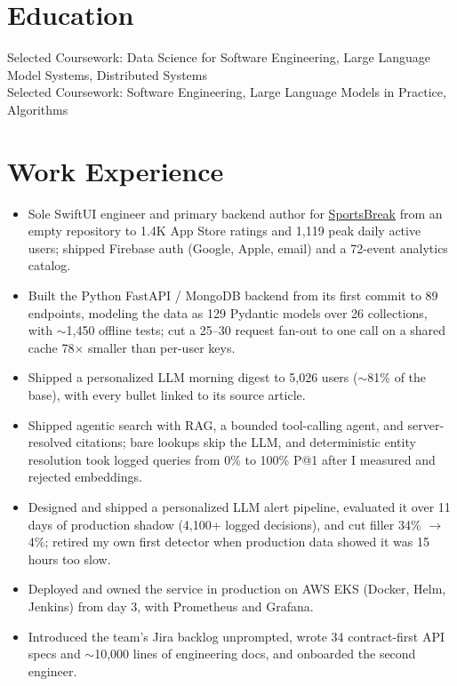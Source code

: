 \documentclass[11pt, letterpaper]{article}
\begin{document}

\section{Education}
Selected Coursework: Data Science for Software Engineering, Large Language Model Systems, Distributed Systems\\[1pt]
Selected Coursework: Software Engineering, Large Language Models in Practice, Algorithms

\section{Work Experience}
\begin{itemize}
  \item Sole SwiftUI engineer and primary backend author for \href{https://apps.apple.com/app/id6762649287}{SportsBreak} from an empty repository to 1.4K App Store ratings and 1{,}119 peak daily active users; shipped Firebase auth (Google, Apple, email) and a 72-event analytics catalog.
  \item Built the Python FastAPI / MongoDB backend from its first commit to 89 endpoints, modeling the data as 129 Pydantic models over 26 collections, with $\sim$1{,}450 offline tests; cut a 25--30 request fan-out to one call on a shared cache 78$\times$ smaller than per-user keys.
  \item Shipped a personalized LLM morning digest to 5{,}026 users ($\sim$81\% of the base), with every bullet linked to its source article.
  \item Shipped agentic search with RAG, a bounded tool-calling agent, and server-resolved citations; bare lookups skip the LLM, and deterministic entity resolution took logged queries from 0\% to 100\% P@1 after I measured and rejected embeddings.
  \item Designed and shipped a personalized LLM alert pipeline, evaluated it over 11 days of production shadow (4{,}100+ logged decisions), and cut filler 34\% $\to$ 4\%; retired my own first detector when production data showed it was 15 hours too slow.
  \item Deployed and owned the service in production on AWS EKS (Docker, Helm, Jenkins) from day 3, with Prometheus and Grafana.
  \item Introduced the team's Jira backlog unprompted, wrote 34 contract-first API specs and $\sim$10{,}000 lines of engineering docs, and onboarded the second engineer.
\end{itemize}
\end{document}

